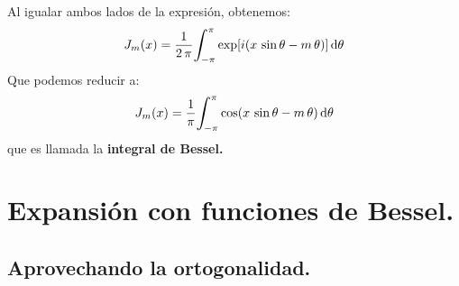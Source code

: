 \documentclass[12pt]{article}
\def\scaleint#1{\vcenter{\hbox{\scaleto[3ex]{\displaystyle\int}{#1}}}}
\def\bs{\mkern-12mu}
\numberwithin{equation}{section}
\begin{document}
Al igualar ambos lados de la expresión, obtenemos:
\begin{align}
J_{m} (x) = \dfrac{1}{2 \, \pi} \scaleint{6ex}_{\bs -\pi}^{\pi} \exp[i (x \, \sin \theta -  m \, \theta)] \dd{\theta}
\label{eq:ecuacion_27_30}
\end{align}
Que podemos reducir a:
\begin{equation}
J_{m} (x) = \dfrac{1}{\pi} \scaleint{6ex}_{\bs -\pi}^{\pi} \cos (x \, \sin \theta -  m \, \theta) \dd{\theta}
\label{eq:ecuacion_27_31}
\end{equation}
que es llamada la \textbf{integral de Bessel.}

\section{Expansión con funciones de Bessel.}
\subsection{Aprovechando la ortogonalidad.}
\end{document}
